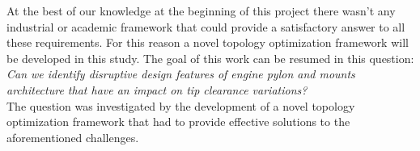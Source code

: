 At the best of our knowledge at the beginning of this project there wasn't any industrial or academic framework that could provide a satisfactory answer to all these requirements. For this reason a novel topology optimization framework will be developed in this study.
The goal of this work can be resumed in this question:\\
\textit{Can we identify disruptive design features of engine pylon and mounts architecture that have an impact on tip clearance variations?} 
\\
The question was investigated by the development of a novel topology optimization framework that had to provide effective solutions to the aforementioned challenges.
